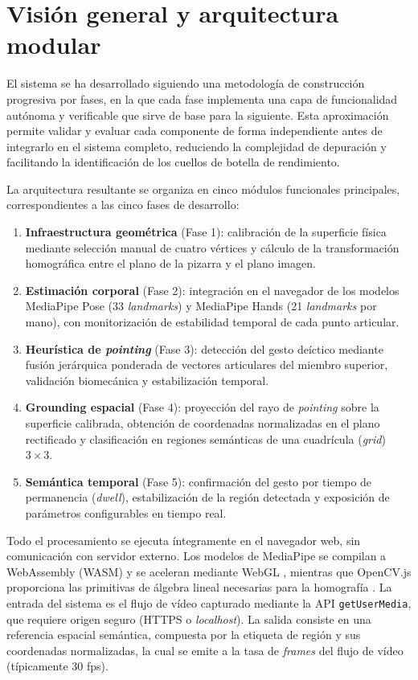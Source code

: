 \documentclass[12pt]{report} %
\begin{document}
\section{Visión general y arquitectura modular}

El sistema se ha desarrollado siguiendo una metodología de construcción progresiva por fases, en la que cada fase implementa una capa de funcionalidad autónoma y verificable que sirve de base para la siguiente. Esta aproximación permite validar y evaluar cada componente de forma independiente antes de integrarlo en el sistema completo, reduciendo la complejidad de depuración y facilitando la identificación de los cuellos de botella de rendimiento.

La arquitectura resultante se organiza en cinco módulos funcionales principales, correspondientes a las cinco fases de desarrollo:

\begin{enumerate}
    \item \textbf{Infraestructura geométrica} (Fase 1): calibración de la superficie física mediante selección manual de cuatro vértices y cálculo de la transformación homográfica entre el plano de la pizarra y el plano imagen.
    \item \textbf{Estimación corporal} (Fase 2): integración en el navegador de los modelos MediaPipe Pose (33 \textit{landmarks}) y MediaPipe Hands (21 \textit{landmarks} por mano), con monitorización de estabilidad temporal de cada punto articular.
    \item \textbf{Heurística de \textit{pointing}} (Fase 3): detección del gesto deíctico mediante fusión jerárquica ponderada de vectores articulares del miembro superior, validación biomecánica y estabilización temporal.
    \item \textbf{Grounding espacial} (Fase 4): proyección del rayo de \textit{pointing} sobre la superficie calibrada, obtención de coordenadas normalizadas en el plano rectificado y clasificación en regiones semánticas de una cuadrícula (\textit{grid}) $3 \times 3$.
    \item \textbf{Semántica temporal} (Fase 5): confirmación del gesto por tiempo de permanencia (\textit{dwell}), estabilización de la región detectada y exposición de parámetros configurables en tiempo real.
\end{enumerate}

Todo el procesamiento se ejecuta íntegramente en el navegador web, sin comunicación con servidor externo. Los modelos de MediaPipe se compilan a WebAssembly (WASM) y se aceleran mediante WebGL \citep{lugaresi2019mediapipe}, mientras que OpenCV.js proporciona las primitivas de álgebra lineal necesarias para la homografía \citep{bradski2000opencv}. La entrada del sistema es el flujo de vídeo capturado mediante la API \texttt{getUserMedia}, que requiere origen seguro (HTTPS o \textit{localhost}). La salida consiste en una referencia espacial semántica, compuesta por la etiqueta de región y sus coordenadas normalizadas, la cual se emite a la tasa de \textit{frames} del flujo de vídeo (típicamente 30 fps).
\end{document}
